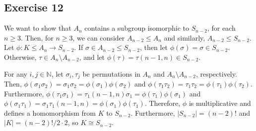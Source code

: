 \subsection*{Exercise 12}
We want to show that $A_n$ contains a subgroup isomorphic to $S_{n-2}$, for each $n \ge 3$. Then, for $n \ge 3$, we can consider $A_{n-2} \le A_n$ and similarly, $A_{n-2} \le S_{n-2}$. Let $\phi: K \le A_n \rightarrow S_{n-2}$. If $\sigma \in A_{n-2} \le S_{n-2}$, then let $\phi(\sigma) = \sigma \in S_{n-2}$. Otherwise, $\tau \in A_n \setminus A_{n-2}$, and let $\phi(\tau) = \tau(n-1, n) \in S_{n-2}$.

For any $i,j \in \mathbb{N}$, let $\sigma_i, \tau_j$ be permutations in $A_n$ and $A_n \setminus A_{n-2}$, respectively. Then, $\phi(\sigma_1\sigma_2) = \sigma_1\sigma_2 = \phi(\sigma_1)\phi(\sigma_2)$ and $\phi(\tau_1\tau_2) = \tau_1\tau_2 = \phi(\tau_1)\phi(\tau_2)$. Furthermore, $\phi(\tau_1\sigma_1) = \tau_1(n-1,n)\sigma_1 = \phi(\tau_1)\phi(\sigma_1)$ and $\phi(\sigma_1\tau_1) = \sigma_1\tau_1(n-1,n) = \phi(\sigma_1)\phi(\tau_1)$. Therefore, $\phi$ is multiplicative and defines a homomorphism from $K$ to $S_{n-2}$. Furthermore, $|S_{n-2}| = (n-2)!$ and $|K| = (n-2)!/2 \cdot 2$, so $K \cong S_{n-2}$.